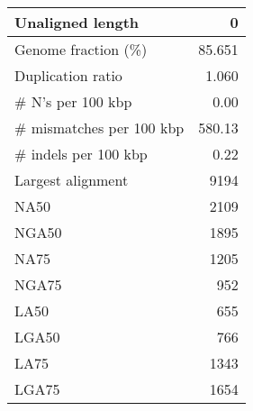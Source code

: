 \documentclass[12pt,a4paper]{article}
\begin{document}
\begin{table}[ht]
\begin{center}
\begin{tabular}{|l*{1}{|r}|}
Unaligned length & 0 \\ \hline
Genome fraction (\%) & 85.651 \\ \hline
Duplication ratio & 1.060 \\ \hline
\# N's per 100 kbp & 0.00 \\ \hline
\# mismatches per 100 kbp & 580.13 \\ \hline
\# indels per 100 kbp & 0.22 \\ \hline
Largest alignment & 9194 \\ \hline
NA50 & 2109 \\ \hline
NGA50 & 1895 \\ \hline
NA75 & 1205 \\ \hline
NGA75 & 952 \\ \hline
LA50 & 655 \\ \hline
LGA50 & 766 \\ \hline
LA75 & 1343 \\ \hline
LGA75 & 1654 \\ \hline
\end{tabular}
\end{center}
\end{table}
\end{document}
